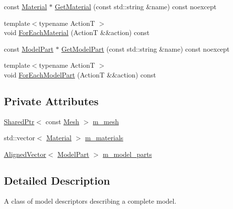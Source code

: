 \begin{DoxyCompactItemize}
\item 
const \mbox{\hyperlink{classmage_1_1rendering_1_1_material}{Material}} $\ast$ \mbox{\hyperlink{classmage_1_1rendering_1_1_model_descriptor_a4e4331d71dfe25f844de71d80c82ff84}{Get\+Material}} (const std\+::string \&name) const noexcept
\item 
{\footnotesize template$<$typename ActionT $>$ }\\void \mbox{\hyperlink{classmage_1_1rendering_1_1_model_descriptor_a4e95ae12e0c952c76aaaf1ee457aed07}{For\+Each\+Material}} (ActionT \&\&action) const
\item 
const \mbox{\hyperlink{structmage_1_1rendering_1_1_model_part}{Model\+Part}} $\ast$ \mbox{\hyperlink{classmage_1_1rendering_1_1_model_descriptor_ab6fda7c3694cdb548be408f46143a083}{Get\+Model\+Part}} (const std\+::string \&name) const noexcept
\item 
{\footnotesize template$<$typename ActionT $>$ }\\void \mbox{\hyperlink{classmage_1_1rendering_1_1_model_descriptor_a9b217d2536bdd34c4b8b93ccf2ef62d3}{For\+Each\+Model\+Part}} (ActionT \&\&action) const
\end{DoxyCompactItemize}
\subsection*{Private Attributes}
\begin{DoxyCompactItemize}
\item 
\mbox{\hyperlink{namespacemage_a1e01ae66713838a7a67d30e44c67703e}{Shared\+Ptr}}$<$ const \mbox{\hyperlink{classmage_1_1rendering_1_1_mesh}{Mesh}} $>$ \mbox{\hyperlink{classmage_1_1rendering_1_1_model_descriptor_a18fd5970f038726fd200e60f3c5ad33e}{m\+\_\+mesh}}
\item 
std\+::vector$<$ \mbox{\hyperlink{classmage_1_1rendering_1_1_material}{Material}} $>$ \mbox{\hyperlink{classmage_1_1rendering_1_1_model_descriptor_ae88269763478f47e5d6c0086a4aeb33b}{m\+\_\+materials}}
\item 
\mbox{\hyperlink{namespacemage_a8664bfb5ce2179fc64eae9f82c8a5ba8}{Aligned\+Vector}}$<$ \mbox{\hyperlink{structmage_1_1rendering_1_1_model_part}{Model\+Part}} $>$ \mbox{\hyperlink{classmage_1_1rendering_1_1_model_descriptor_a2c2eda62e6f2c7f6274a0f829b6abfa1}{m\+\_\+model\+\_\+parts}}
\end{DoxyCompactItemize}


\subsection{Detailed Description}
A class of model descriptors describing a complete model. 

